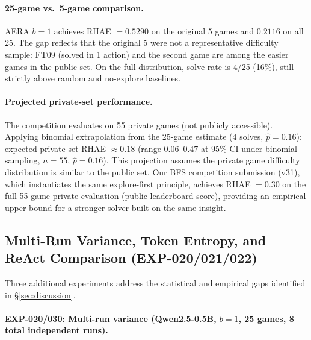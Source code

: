 \documentclass[11pt]{article}
\begin{document}
\paragraph{25-game vs.\ 5-game comparison.} AERA $b{=}1$ achieves RHAE $=0.5290$ on the original 5 games and $0.2116$ on all 25. The gap reflects that the original 5 were not a representative difficulty sample: FT09 (solved in 1 action) and the second game are among the easier games in the public set. On the full distribution, solve rate is 4/25 (16\%), still strictly above random and no-explore baselines.

\paragraph{Projected private-set performance.} The competition evaluates on 55 private games (not publicly accessible). Applying binomial extrapolation from the 25-game estimate (4 solves, $\hat{p} = 0.16$): expected private-set RHAE $\approx 0.18$ (range $0.06$--$0.47$ at 95\% CI under binomial sampling, $n{=}55$, $\hat{p}{=}0.16$). This projection assumes the private game difficulty distribution is similar to the public set. Our BFS competition submission (v31), which instantiates the same explore-first principle, achieves RHAE $= 0.30$ on the full 55-game private evaluation (public leaderboard score), providing an empirical upper bound for a stronger solver built on the same insight.

\subsection{Multi-Run Variance, Token Entropy, and ReAct Comparison (EXP-020/021/022)}
\label{sec:stats}

Three additional experiments address the statistical and empirical gaps identified in \S\ref{sec:discussion}.

\paragraph{EXP-020/030: Multi-run variance (Qwen2.5-0.5B, $b{=}1$, \textbf{25 games}, \textbf{8 total independent runs}).}
\end{document}
